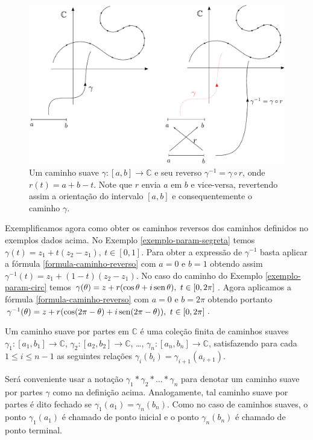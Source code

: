 \begin{figure}[h]
\centering
\includegraphics[width=0.9\linewidth]{Figuras/fig-gamma-gamma-reverso}
\caption{Um caminho suave $\gamma:[a,b]\to\mathbb{C}$ e seu reverso $\gamma^{-1}= \gamma\circ r$, onde $r(t)=a+b-t$.
Note que $r$ envia $a$ em $b$ e vice-versa, revertendo assim a orientação do intervalo $[a,b]$ e 
consequentemente o caminho $\gamma$.}
\label{fig-gamma-gamma-reverso}
\end{figure}



Exemplificamos agora como obter os caminhos reversos dos caminhos definidos no exemplos dados
acima.
No Exemplo \ref{exemplo-param-segreta} temos $\gamma(t) = z_1+t(z_2-z_1),\ t\in[0,1]$. Para obter a
expressão de $\gamma^{-1}$ basta aplicar a fórmula \eqref{formula-caminho-reverso} com $a=0$ e $b=1$
obtendo assim $\gamma^{-1}(t) = z_1+(1-t)(z_2-z_1)$. 
No caso do caminho do Exemplo \ref{exemplo-param-circ} temos 
$\gamma(\theta) = z+r(\cos\theta+i\sen\theta),\ t\in[0,2\pi]$. Agora aplicamos a fórmula 
\eqref{formula-caminho-reverso} com $a=0$ e $b=2\pi$ obtendo portanto 
$\gamma^{-1}(\theta) = z+r(\cos(2\pi-\theta)+i\operatorname{sen}(2\pi-\theta)),\ t\in[0,2\pi]$.

\begin{definicao}
\label{def-caminho-suave-partes}
Um caminho suave por partes em $\mathbb{C}$ é uma coleção finita de caminhos suaves
$\gamma_{1}:[a_1,b_1]\to\mathbb{C}$, $\gamma_{2}:[a_2,b_2]\to\mathbb{C}$, \ldots, 
$\gamma_{n}:[a_n,b_n]\to\mathbb{C}$, satisfazendo para cada $1\leqslant i\leqslant n-1$
as seguintes relações $\gamma_{i}(b_i)=\gamma_{i+1}(a_{i+1})$.
\end{definicao}


Será conveniente usar a notação $\gamma_1*\gamma_2*\ldots*\gamma_n$ para denotar um caminho suave
por partes $\gamma$ como na definição acima. Analogamente, tal caminho suave por partes é dito
fechado se $\gamma_1(a_1)=\gamma_{n}(b_n)$. Como no caso de caminhos suaves, 
o ponto $\gamma_1(a_1)$ é chamado de ponto inicial e o ponto 
$\gamma_n(b_n)$ é chamado de ponto terminal. 


